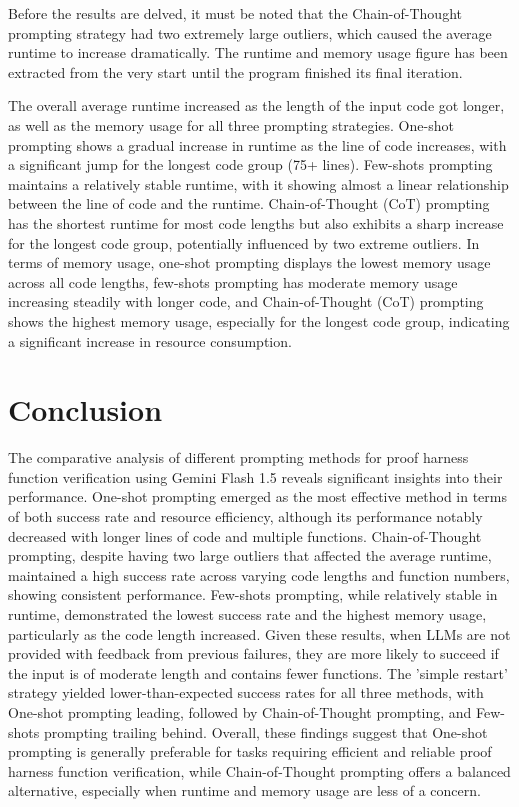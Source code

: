 \documentclass[onecolumn]{NobArticle}
\begin{document}
\quad Before the results are delved, it must be noted that the Chain-of-Thought prompting strategy had two extremely large outliers, which caused the average runtime to increase dramatically. The runtime and memory usage figure has been extracted from the very start until the program finished its final iteration. \newline

\quad The overall average runtime increased as the length of the input code got longer, as well as the memory usage for all three prompting strategies. One-shot prompting shows a gradual increase in runtime as the line of code increases, with a significant jump for the longest code group (75+ lines). Few-shots prompting maintains a relatively stable runtime, with it showing almost a linear relationship between the line of code and the runtime. Chain-of-Thought (CoT) prompting has the shortest runtime for most code lengths but also exhibits a sharp increase for the longest code group, potentially influenced by two extreme outliers. In terms of memory usage, one-shot prompting displays the lowest memory usage across all code lengths, few-shots prompting has moderate memory usage increasing steadily with longer code, and Chain-of-Thought (CoT) prompting shows the highest memory usage, especially for the longest code group, indicating a significant increase in resource consumption.


\vspace{11pt}
\section{Conclusion}
\quad The comparative analysis of different prompting methods for proof harness function verification using Gemini Flash 1.5 reveals significant insights into their performance. One-shot prompting emerged as the most effective method in terms of both success rate and resource efficiency, although its performance notably decreased with longer lines of code and multiple functions. Chain-of-Thought prompting, despite having two large outliers that affected the average runtime, maintained a high success rate across varying code lengths and function numbers, showing consistent performance. Few-shots prompting, while relatively stable in runtime, demonstrated the lowest success rate and the highest memory usage, particularly as the code length increased. Given these results, when LLMs are not provided with feedback from previous failures, they are more likely to succeed if the input is of moderate length and contains fewer functions. The 'simple restart' strategy yielded lower-than-expected success rates for all three methods, with One-shot prompting leading, followed by Chain-of-Thought prompting, and Few-shots prompting trailing behind. Overall, these findings suggest that One-shot prompting is generally preferable for tasks requiring efficient and reliable proof harness function verification, while Chain-of-Thought prompting offers a balanced alternative, especially when runtime and memory usage are less of a concern.
\end{document}

